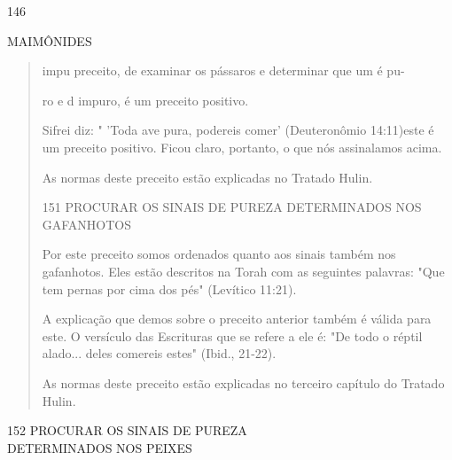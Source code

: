 146

MAIMÔNIDES

\begin{quote}
impu preceito, de examinar os pássaros e determinar que um é pu-

ro e d impuro, é um preceito positivo.

Sifrei diz: " 'Toda ave pura, podereis comer' (Deuteronômio 14:11)este é
um preceito positivo. Ficou claro, portanto, o que nós assinala­mos
acima.

As normas deste preceito estão explicadas no Tratado Hulin.

151 PROCURAR OS SINAIS DE PUREZA DETERMINADOS NOS GAFANHOTOS

Por este preceito somos ordenados quanto aos sinais também nos
gafanhotos. Eles estão descritos na Torah com as seguintes palavras:
"Que tem pernas por cima dos pés" (Levítico 11:21).

A explicação que demos sobre o preceito anterior também é válida para
este. O versículo das Escrituras que se refere a ele é: "De todo o
réptil alado... deles comereis estes" (Ibid., 21-22).

As normas deste preceito estão explicadas no terceiro capítulo do
Tratado Hulin.
\end{quote}

152 PROCURAR OS SINAIS DE PUREZA\\
DETERMINADOS NOS PEIXES

